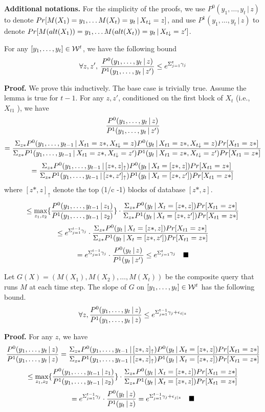 \documentclass[11pt]{article}
\begin{document}
{\bf Additional notations. } For the simplicity of the proofs, we use $P^{0}(y_{1}, \dots , y_{t} \,|\, z)$ to denote $Pr[M(X_{1})=y_{1}, \dots M(X_{t})=y_{t}\,|\,X_{t \downarrow}=z] $, and use $P^{1}(y_{1}, \dots , y_{t} \,|\, z)$ to denote $Pr[M(alt(X_{1}))=y_{1}, \dots M(alt(X_{t}))=y_{t}\,|\,X_{t \downarrow}=z'] $. 
\begin{lemma}
For any $[y_{1}, \dots , y_{t}] \in {\cal W}^{t}$, we have the following bound
\[
\forall z, z', \, \frac{P^{0}(y_{1}, \dots , y_{t} \,|\, z) }{P^{1}(y_{1}, \dots , y_{t} \,|\, z')} \leq e^{\Sigma_{j=1}^{t}\gamma_{j}}
\]
\end{lemma}
{\bf Proof.} We prove this inductively. The base case is trivially true. Assume the lemma is true for $t-1$. For any $z, z'$, conditioned on the first block of $X_{t}$ (i.e., $X_{t1}$ ), we have
\[
\frac{P^{0}(y_{1}, \dots , y_{t} \,|\, z) }{P^{1}(y_{1}, \dots , y_{t} \,|\, z')} 
\]
\[
 = \frac{\Sigma_{z*}P^{0}(y_{1}, \dots , y_{t-1} \,|\, X_{t1}=z*, X_{t \downarrow}=z) P^{0}(y_{t} \,|\, X_{t1}=z*, X_{t \downarrow}=z) Pr[X_{t1}=z*]}{\Sigma_{z*}P^{1}(y_{1}, \dots , y_{t-1} \,|\, X_{t1}=z*, X_{t \downarrow}=z') P^{1}(y_{t} \,|\, X_{t1}=z*, X_{t \downarrow}=z') Pr[X_{t1}=z*]}
\]
\[
=\frac{\Sigma_{z*}P^{0}(y_{1}, \dots , y_{t-1} \,|\, [z*,z]_{\uparrow}) P^{0}(y_{t} \,|\, X_{t}=[z*,z]) Pr[X_{t1}=z*]}{\Sigma_{z*}P^{1}(y_{1}, \dots , y_{t-1} \,|\, [z*,z']_{\uparrow}) P^{1}(y_{t} \,|\, X_{t}=[z*,z']) Pr[X_{t1}=z*]}
\]
where $[z*,z]_{\uparrow}$ denote the top (1/c -1) blocks of database $[z*, z]$.
\[
\leq \max_{z_{1}, z_{2}} \{ \frac{P^{0}(y_{1}, \dots , y_{t-1} \,|\, z_{1})}{P^{1}(y_{1}, \dots , y_{t-1} \,|\, z_{2})} \} \cdot \frac{\Sigma_{z*}P^{0}(y_{t} \,|\, X_{t}=[z*,z]) Pr[X_{t1}=z*]}{\Sigma_{z*}P^{1}(y_{t} \,|\, X_{t}=[z*,z']) Pr[X_{t1}=z*]}
\]
\[
\leq e^{\Sigma_{j=1}^{t-1} \gamma_{j}} \cdot \frac{\Sigma_{z*}P^{0}(y_{t} \,|\, X_{t}=[z*,z]) Pr[X_{t1}=z*]}{\Sigma_{z*}P^{1}(y_{t} \,|\, X_{t}=[z*,z']) Pr[X_{t1}=z*]}
\]
\[
= e^{\Sigma_{j=1}^{t-1}\gamma_{j}} \cdot \frac{P^{0}(y_{t} \,|\, z)}{ P^{1}(y_{t} \,|\, z')} \leq e^{\Sigma_{j=1}^{t}\gamma_{j}} \quad \blacksquare
\]
\begin{lemma}\label{slope_bound}
Let $G(X) = (M(X_{1}), M(X_{2}) , \dots, M(X_{t}))$ be the composite query that runs $M$ at each time step. The slope of $G$ on $[y_{1}, \dots , y_{t}] \in {\cal W}^{t}$ has the following bound.
\[
\forall z, \frac{P^{0}(y_{1}, \dots , y_{t} \,|\, z)}{P^{1}(y_{1}, \dots , y_{t} \,|\, z)} \leq e^{\Sigma_{j=1}^{t-1}\gamma_{j} + \epsilon_{t|z}}
\]
\end{lemma}
{\bf Proof.} For any $z$, we have
\[
\frac{P^{0}(y_{1}, \dots , y_{t} \,|\, z)}{P^{1}(y_{1}, \dots , y_{t} \,|\, z)} = \frac{\Sigma_{z*} P^{0}(y_{1}, \dots , y_{t-1} \,|\, [z*,z]_\uparrow) P^{0}(y_{t} \,|\, X_{t}=[z*,z]) Pr[X_{t1}=z*]}{\Sigma_{z*} P^{1}(y_{1}, \dots , y_{t-1} \,|\, [z*,z]_\uparrow) P^{1}(y_{t} \,|\, X_{t}=[z*,z])Pr[X_{t1}=z*]}
\] 
\[
\leq \max_{z_{1}, z_{2}} \{ \frac{P^{0}(y_{1}, \dots , y_{t-1} \,|\, z_{1})}{P^{1}(y_{1}, \dots , y_{t-1} \,|\, z_{2})} \} \cdot \frac{\Sigma_{z*}P^{0}(y_{t} \,|\, X_{t}=[z*,z]) Pr[X_{t1}=z*]}{\Sigma_{z*}P^{1}(y_{t} \,|\, X_{t}=[z*,z]) Pr[X_{t1}=z*]}
\]
\[
= e^{\Sigma_{j=1}^{t-1}\gamma_{j}} \cdot \frac{P^{0}(y_{t} \,|\, z)}{ P^{1}(y_{t} \,|\, z)} = e^{\Sigma_{j=1}^{t-1}\gamma_{j} + \epsilon_{j|z}} \quad \blacksquare
\]
\end{document}
